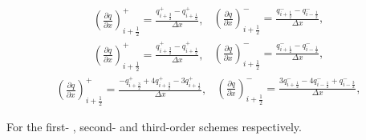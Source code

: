 \documentclass[12pt]{article}
\begin{document}
\begin{subequations}
\begin{gather}\label{eq:derivdisco1p}
\left(\frac{\partial q}{\partial x}\right)^+_{i + \frac{1}{2}} = \frac{ q^+_{i + \frac{3}{2}} - q^+_{i + \frac{1}{2}}}{\Delta x},
\end{gather}
\begin{gather}\label{eq:derivdisco1m}
\left(\frac{\partial q}{\partial x}\right)^-_{i + \frac{1}{2}} = \frac{ q^-_{i + \frac{1}{2}} - q^-_{i - \frac{1}{2}}}{\Delta x},
\end{gather}
\end{subequations}
\label{eq:derivdisco1}
\begin{subequations}
\begin{gather}\label{eq:derivdisco2p}
\left(\frac{\partial q}{\partial x}\right)^+_{i + \frac{1}{2}} = \frac{ q^+_{i + \frac{3}{2}} - q^+_{i + \frac{1}{2}}}{\Delta x},
\end{gather}
\begin{gather}\label{eq:derivdisco2m}
\left(\frac{\partial q}{\partial x}\right)^-_{i + \frac{1}{2}} = \frac{ q^-_{i + \frac{1}{2}} - q^-_{i - \frac{1}{2}}}{\Delta x},
\end{gather}
\end{subequations}
\begin{subequations}
\begin{gather}\label{eq:derivdisco3p}
\left(\frac{\partial q}{\partial x}\right)^+_{i + \frac{1}{2}} = \frac{ -q^+_{i + \frac{3}{2}} + 4q^+_{i + \frac{3}{2}}  -3 q^+_{i + \frac{1}{2}}}{\Delta x},
\end{gather}
\begin{gather}\label{eq:derivdisco3m}
\left(\frac{\partial q}{\partial x}\right)^-_{i + \frac{1}{2}} = \frac{ 3q^-_{i + \frac{1}{2}} - 4q^-_{i - \frac{1}{2}} + q^-_{i - \frac{3}{2}}}{\Delta x},
\end{gather}
\end{subequations}
\label{eq:derivdisco3}

For the first- , second- and third-order schemes respectively. 
\end{document}
